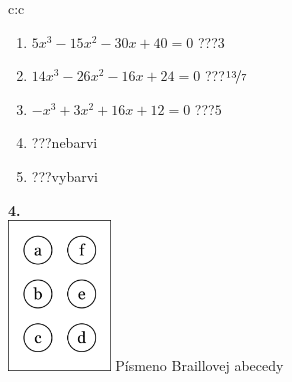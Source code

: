 \documentclass[10pt]{report}
\begin{document}
\begin{tabular}{c:c}
\begin{minipage}[c][104.5mm][t]{0.5\linewidth}
\begin{center}
\begin{minipage}{0.79\linewidth}
\begin{center}
\begin{varwidth}{\linewidth}
\begin{enumerate}
\item $5x^3-15x^2-30x+40=0$\quad \dotfill\; ???\;\dotfill \quad $3$
\item $14x^3-26x^2-16x+24=0$\quad \dotfill\; ???\;\dotfill \quad $\nicefrac{13}{7}$
\item $-x^3+3x^2+16x+12=0$\quad \dotfill\; ???\;\dotfill \quad $5$
\item \quad \dotfill\; ???\;\dotfill \quad nebarvi
\item \quad \dotfill\; ???\;\dotfill \quad vybarvi
\end{enumerate}
\end{varwidth}
\end{center}
\end{minipage}
\begin{minipage}{0.20\linewidth}
\begin{center}
{\Huge\bfseries 4.} \\[2mm]
\includegraphics[height=40mm]{../images/braille.png}
{\small Písmeno Braillovej abecedy}
\end{center}
\end{minipage}
\end{center}
\end{minipage}
%
\end{tabular}
\newpage
\thispagestyle{empty}
\end{document}
